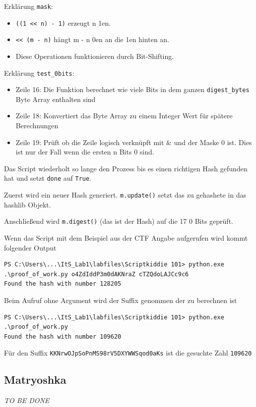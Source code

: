 \documentclass[12pt,a4paper,titlepage,oneside]{scrartcl}
\begin{document}
Erklärung \lstinline{mask}:
\begin{itemize}
    \item \lstinline{((1 << n) - 1)} erzeugt n 1en.
    \item \lstinline{<< (m - n)} hängt m - n 0en an die 1en hinten an.
    \item Diese Operationen funktionieren durch Bit-Shifting.
\end{itemize}

Erklärung \lstinline{test_0bits}:
\begin{itemize}
    \item Zeile 16: Die Funktion berechnet wie viele Bits in dem ganzen \lstinline{digest_bytes} Byte Array enthalten sind
    \item Zeile 18: Konvertiert das Byte Array zu einem Integer Wert für spätere Berechnungen
    \item Zeile 19: Prüft ob die Zeile logisch verknüpft mit \& und der Maske 0 ist. Dies ist nur der Fall wenn die ersten n Bits 0 sind.
\end{itemize}

Das Script wiederholt so lange den Prozess bis es einen richtigen Hash gefunden hat und setzt \lstinline{done} auf \lstinline{True}.

Zuerst wird ein neuer Hash generiert. \lstinline{m.update()} setzt das zu gehashete in das hashlib Objekt.

Anschließend wird \lstinline{m.digest()} (das ist der Hash) auf die 17 0 Bits geprüft.

Wenn das Script mit dem Beispiel aus der CTF Angabe aufgerufen wird kommt folgender Output

\begin{lstlisting}
PS C:\Users\...\ItS_Lab1\labfiles\Scriptkiddie 101> python.exe .\proof_of_work.py o4ZdIddP3m0dAKNraZ cTZQdoLAJCc9c6
Found the hash with number 128205
\end{lstlisting}

Beim Aufruf ohne Argument wird der Suffix genommen der zu berechnen ist

\begin{lstlisting}
PS C:\Users\...\ItS_Lab1\labfiles\Scriptkiddie 101> python.exe .\proof_of_work.py
Found the hash with number 109620
\end{lstlisting}

Für den Suffix \lstinline{KKNrwOJpSoPnMS98rV5DXYWWSqod0aKs} ist die gesuchte Zahl \lstinline{109620}

\subsection{Matryoshka}
\emph{TO BE DONE}
\end{document}
